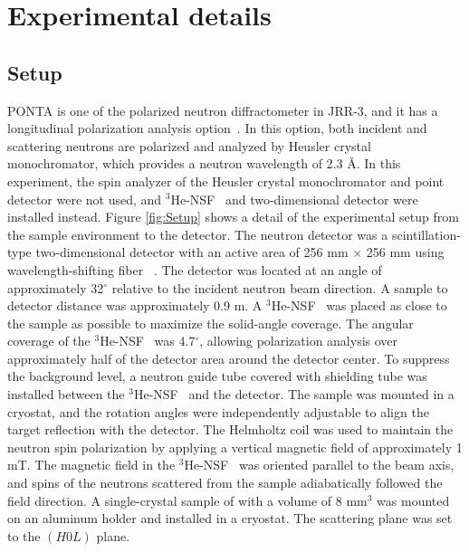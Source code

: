 \documentclass[%
 reprint,
superscriptaddress,
 amsmath,amssymb,
 aps,
]{revtex4-2}
\newcommand{\Hensf}{$^3$He-NSF}
\begin{document}
\section{Experimental details}


\subsection{Setup}
PONTA is one of the polarized neutron diffractometer in JRR-3, and it has a longitudinal polarization analysis option~\cite{nakajima_polarized_2024}.
In this option, both incident and scattering neutrons are polarized and analyzed by  Heusler crystal monochromator, which provides a neutron wavelength of 2.3 \AA.
In this experiment, the spin analyzer of the  Heusler crystal monochromator and point detector were not used, and \Hensf~ and two-dimensional detector were installed instead.
Figure \ref{fig:Setup} shows a detail of the experimental setup from the sample environment to the detector.
The neutron detector was a scintillation-type two-dimensional detector with an active area of 256 mm $\times$ 256 mm using wavelength-shifting fiber~\cite{nakamura_large-area_2012} .
The detector was located at an angle of approximately 32$^{\circ}$ relative to the incident neutron beam direction.
A sample to detector distance was approximately 0.9 m.
A \Hensf~ was placed as close to the sample as possible to maximize the solid-angle coverage.
The angular coverage of the \Hensf~ was 4.7$^{\circ}$, allowing polarization analysis over approximately half of the detector area around the detector center.
To suppress the background level, a neutron guide tube covered with  shielding tube was installed between the \Hensf~ and the detector.
The sample was mounted in a cryostat, and the rotation angles were independently adjustable to align the target reflection with the detector.
The Helmholtz coil was used to maintain the neutron spin polarization by applying a vertical magnetic field of approximately 1 mT.
The magnetic field in the \Hensf~ was oriented parallel to the beam axis, and spins of the neutrons scattered from the sample adiabatically followed the field direction.
A single-crystal sample of  with a volume of 8 mm$^3$ was mounted on an aluminum holder and installed in a cryostat.
The scattering plane was set to the \((H0L)\) plane.
\end{document}
